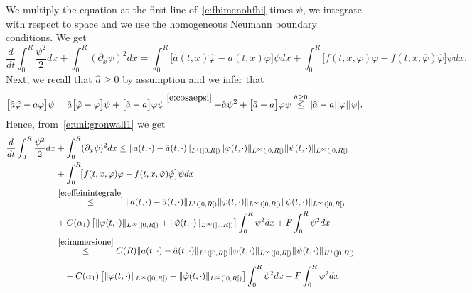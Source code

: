 \documentclass[11pt,leqno]{amsart}
\numberwithin{equation}{section}
\begin{document}
We multiply the equation at the first line of~\eqref{e:fhimenohfhi} times $\psi$, we integrate with respect to  
space and we use the homogeneous Neumann boundary conditions. We get 
\begin{equation}
  \label{e:uni:gronwall1}
  \frac{d}{dt } \int_0^R \frac{\psi^2}{2} dx  +
  \int_0^R ({\partial_x } \psi)^2 dx = \int_0^R \! \!
  \big[  \hat a (t, x) 
  \hat {\varphi} -a (t, x) {\varphi} \big] \psi dx  +  \int_0^R \! \! 
  \big[ f(t, x, {\varphi}) {\varphi}- f(t, x, \hat {\varphi}) 
  \hat {\varphi} \big] \psi dx.
     \end{equation}
 Next, we recall that $\hat a \ge 0$ by assumption
 and we infer that 
 $$
     \big[  \hat a  
       \hat {\varphi} -a  {\varphi} \big] \psi =
       \hat a \big[ \hat {\varphi} - {\varphi} \big] \psi +
     \big[  \hat a  
        -a   \big] {\varphi} \psi  \stackrel{\eqref{e:cosaepsi}}{=}
        -\hat a \psi^2 + 
         \big[  \hat a  
        -a   \big] {\varphi} \psi 
       \stackrel{\hat a \ge 0}{\leq}
       |\hat a  
        -a  || {\varphi}|| \psi|. 
 $$
 Hence, from~\eqref{e:uni:gronwall1} we get 
 \begin{equation}
   \label{e:uni:gronwall2}
   \begin{split}
     \frac{d}{dt } \int_0^R \frac{\psi^2}{2} dx & + \int_0^R ({\partial_x }
     \psi)^2 dx \leq \| a (t, \cdot) - \hat a (t, \cdot) \|_{L^1 (]0,
       R[)} \| {\varphi}(t, \cdot) \|_{L^\infty (]0, R[)} \| \psi (t,
     \cdot) \|_{L^\infty (]0, R[)} 
     \\ 
     & + \int_0^R \! \! \big[ f(t, x,
     {\varphi}) {\varphi}- f(t, x, \hat {\varphi})
     \hat {\varphi} \big] \psi dx    
     \\
     & \stackrel{\eqref{e:effeinintegrale}}{\leq} \| a (t, \cdot) -
     \hat a (t, \cdot) \|_{L^1 (]0, R[)} \| {\varphi} (t, \cdot)
     \|_{L^\infty (]0, R[)} \| \psi (t, \cdot) \|_{L^\infty (]0, R[)}
     \\
     & + C(\alpha_1) \left[\| {\varphi}(t, \cdot) \|_{L^\infty (]0, R[)} +
       \|\hat{\varphi}(t, \cdot) \|_{L^\infty (]0, R[)}\right]
     \int_0^R \psi^2 dx + F \int_0^R \psi^2 dx
     \\
     & \stackrel{\eqref{e:immersione}}{\leq} C(R) \| a (t, \cdot) -
     \hat a (t, \cdot) \|_{L^1 (]0, R[)} \| {\varphi} (t, \cdot)
     \|_{L^\infty (]0, R[)}
     \| \psi (t, \cdot) \|_{H^1 (]0, R[)} \phantom{\int} 
     \\
     & \quad + C(\alpha_1) \left[\| {\varphi}(t, \cdot) \|_{L^\infty (]0, R[)}
     + \|\hat{\varphi}(t, \cdot) \|_{L^\infty (]0, R[)}\right]
     \int_0^R \psi^2 dx + F \int_0^R \psi^2 dx.
   \end{split}
 \end{equation}  
\end{document}
